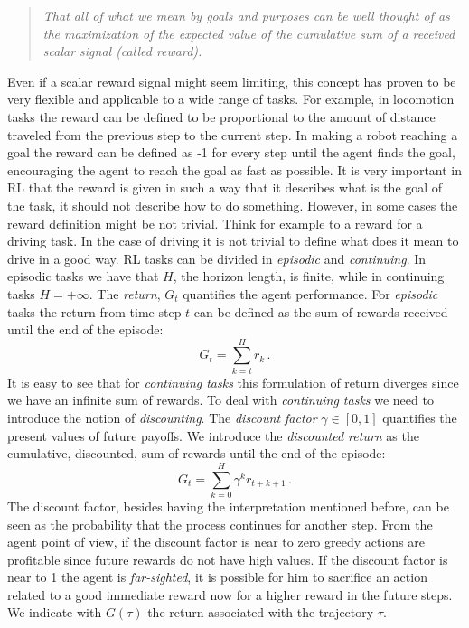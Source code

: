\begin{quotation}
	 \emph{That all of what we mean by goals and purposes can be well thought of as the maximization of the expected value of the cumulative sum of a received scalar signal (called reward).}
\end{quotation}

 Even if a scalar reward signal might seem limiting, this concept has proven to be very flexible and applicable to a wide range of tasks. For example, in locomotion tasks the reward can be defined to be proportional to the amount of distance traveled from the previous step to the current step. In making a robot reaching a goal the reward can be defined as -1 for every step until the agent finds the goal, encouraging the agent to reach the goal as fast as possible.
 It is very important in RL that the reward is given in such a way that it describes what is the goal of the task, it should not describe how to do something. However, in some cases the reward definition might be not trivial. Think for example to a reward for a driving task. In the case of driving it is not trivial to define what does it mean to drive in a good way. \newline
RL tasks can be divided in \textit{episodic} and \textit{continuing}. In episodic tasks we have that $H$, the horizon length, is finite, while in continuing tasks $H = +\infty$.
The \textit{return}, $G_t$ quantifies the agent performance. For \textit{episodic} tasks the return from time step $t$ can be defined as the sum of rewards received until the end of the episode:
\begin{equation}
G_t = \sum_{k=t}^H r_k	\, .
\end{equation}
It is easy to see that for \textit{continuing tasks} this formulation of return diverges since we have an infinite sum of rewards.
To deal with \textit{continuing tasks} we need to introduce the notion of \textit{discounting}. The \textit{discount factor} $\gamma \in [0,1]$ quantifies the present values of future payoffs. 
We introduce the \textit{discounted return} as the cumulative, discounted, sum of rewards until the end of the episode:
\begin{equation}
G_t = \sum_{k=0}^H \gamma^k r_{t+k+1} \, .
\end{equation}
The discount factor, besides having the interpretation mentioned before, can be seen as the probability that the process continues for another step. From the agent point of view, if the discount factor is near to zero greedy actions are profitable since future rewards do not have high values. If the discount factor is near to 1 the agent is \textit{far-sighted}, it is possible for him to sacrifice an action related to a good immediate reward now for a higher reward in the future steps.
We indicate with $G(\tau)$ the return associated with the trajectory $\tau$.
